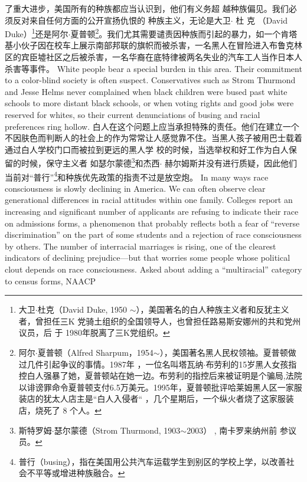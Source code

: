 \begin{paracol}{2}
了重大进步，美国所有的种族都应当认识到，他们有义务超
越种族偏见。我们必须反对来自任何方面的公开宣扬仇恨的
种族主义，无论是大卫$\cdot$ 杜 克 （David  Duke）\footnote{大卫$\cdot$杜克（David Duke, 1950 $\sim$），美国著名的白人种族主义者和反犹主义者，曾担任三K 党骑土组织的全国领导人，也曾担任路易斯安娜州的共和党州议员，后 于 1980年脱离了三K党组织。}还是阿尔$\cdot$夏普顿\footnote{阿尔$\cdot$夏普顿（Alfred Sharpum，1954$\sim$），美国著名黑人民权领袖。夏普顿做过几件引起争议的事情。1987年 ，一位名叫塔瓦纳$\cdot$布劳利的15岁黑人女孩指控白人强暴了她，夏普顿站在她一边。布劳利的指控后来被证明是个骗局,法院以诽谤罪命令夏普顿支付6.5万美元。1995年，夏普顿批评哈莱姆黑人区一家服装店的犹太人店主是“白人入侵者“ ，几个星期后，一个纵火者烧了这家服装店，烧死了 8 个人。}。我们尤其需要谴责因种族而引起的暴力，如一个肯塔基小伙子因在校车上展示南部邦联的旗帜而被杀害，一名黑人在冒险进入布鲁克林区的宾臣墟社区之后被杀害，一名华裔在底特律被两名失业的汽车工人当作日本人杀害等事件。
\switchcolumn*
White people bear a special burden in this area. Their commitment to a color-blind society is often suspect. Conservatives
such as Strom Thurmond and Jesse Helms never complained
when black children were bused past white schools to more distant black schools, or when voting rights and good jobs were reserved for whites, so their current denunciations of busing and
racial preferences ring hollow.
\switchcolumn
白人在这个问题上应当承担特殊的责任。他们在建立一个
不因肤色而判断人的社会上的作为常常让人感觉靠不住。当黑人孩子被用巴士载着通过白人学校门口而被拉到更远的黑人学
校的时候，当选举权和好工作为白人保留的时候，保守主义者
如瑟尔蒙德\footnote{斯特罗姆$\cdot$瑟尔蒙德（Strom Thurmond, 1903$\sim$2003） , 南卡罗来纳州前	参议员。}和杰西$\cdot$ 赫尔姆斯并没有进行质疑，因此他们当前对“普行”\footnote{普行（busing），指在美国用公共汽车运载学生到别区的学校上学，以改善社会不平等或增进种族融合。}和种族优先政策的指责不过是放空炮。
\switchcolumn*
In many ways race consciousness is slowly declining in
America. We can often observe clear generational differences in
racial attitudes within one family. Colleges report an increasing
and significant number of applicants are refusing to indicate
their race on admissions forms, a phenomenon that probably reflects both a fear of ``reverse discrimination'' on the part of some
students and a rejection of race consciousness by others. The
number of interracial marriages is rising, one of the clearest indicators of declining prejudice---but that worries some people
whose political clout depends on race consciousness. Asked
about adding a ``multiracial'' category to census forms, NAACP

\end{paracol}
